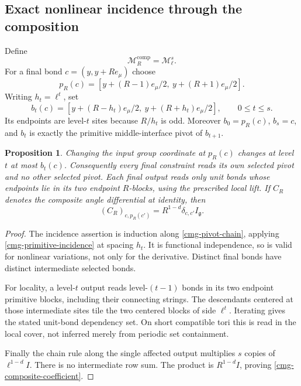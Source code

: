 \documentclass[11pt]{article}
\newtheorem{proposition}[theorem]{Proposition}
\theoremstyle{remark}
\begin{document}
\subsection{Exact nonlinear incidence through the composition}
\label{cmg-composite-section}

Define
\begin{equation}
 \mathcal M_R^{\mathrm{comp}}=\mathcal M_\ell^s.
 \label{cmg-composite}
\end{equation}
For a final bond $c=(y,y+Re_\mu)$ choose
\begin{equation}
 p_R(c)=[y+(R-1)e_\mu/2,\ y+(R+1)e_\mu/2].
 \label{cmg-macro-pivot}
\end{equation}
Writing $h_t=\ell^t$, set
\begin{equation}
 b_t(c)=[y+(R-h_t)e_\mu/2,\ y+(R+h_t)e_\mu/2],
 \qquad 0\le t\le s.
 \label{cmg-pivot-chain}
\end{equation}
Its endpoints are level-$t$ sites because $R/h_t$ is odd.
Moreover $b_0=p_R(c)$, $b_s=c$, and $b_t$ is exactly the primitive
middle-interface pivot of $b_{t+1}$.

\begin{proposition}
\label{cmg-incidence-proposition}
Changing the input group coordinate at $p_R(c)$ changes at level $t$
at most $b_t(c)$. Consequently every final constraint reads its own
selected pivot and no other selected pivot. Each final output reads
only unit bonds whose endpoints lie in its two endpoint $R$-blocks,
using the prescribed local lift. If $C_R$ denotes the composite angle
differential at identity, then
\begin{equation}
 (C_R)_{c,p_R(c')}=R^{1-d}\delta_{c,c'}I_{\mathfrak g}.
 \label{cmg-composite-coefficient}
\end{equation}
\end{proposition}

\begin{proof}
The incidence assertion is induction along
\eqref{cmg-pivot-chain}, applying
\eqref{cmg-primitive-incidence} at spacing $h_t$.
It is functional independence, so is valid for nonlinear variations,
not only for the derivative. Distinct final bonds have distinct
intermediate selected bonds.

For locality, a level-$t$ output reads level-$(t-1)$ bonds in its two
endpoint primitive blocks, including their connecting strings.
The descendants centered at those intermediate sites tile the two
centered blocks of side $\ell^t$. Iterating gives the stated unit-bond
dependency set. On short compatible tori this is read in the local
cover, not inferred merely from periodic set containment.

Finally the chain rule along the single affected output multiplies
$s$ copies of $\ell^{1-d}I$. There is no intermediate row sum.
The product is $R^{1-d}I$, proving
\eqref{cmg-composite-coefficient}.
\end{proof}
\end{document}

